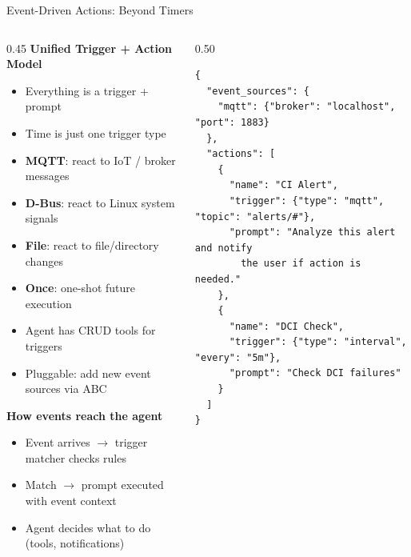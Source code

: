 \documentclass[aspectratio=169,10pt]{beamer}
\begin{document}
\begin{frame}[fragile]{Event-Driven Actions: Beyond Timers}
\begin{columns}[T]
\begin{column}{0.45\textwidth}
\textbf{Unified Trigger + Action Model}
\begin{itemize}\scriptsize\setlength{\itemsep}{1pt}
  \item Everything is a \alert{trigger + prompt}
  \item Time is just one trigger type
  \item \textbf{MQTT}: react to IoT / broker messages
  \item \textbf{D-Bus}: react to Linux system signals
  \item \textbf{File}: react to file/directory changes
  \item \textbf{Once}: one-shot future execution
  \item Agent has CRUD tools for triggers
  \item Pluggable: add new event sources via ABC
\end{itemize}

\smallskip
\textbf{How events reach the agent}
\begin{itemize}\scriptsize\setlength{\itemsep}{1pt}
  \item Event arrives $\to$ trigger matcher checks rules
  \item Match $\to$ prompt executed with event context
  \item Agent decides what to do (tools, notifications)
\end{itemize}
\end{column}
\begin{column}{0.50\textwidth}
\begin{lstlisting}[style=json,basicstyle=\ttfamily\fontsize{5}{6}\selectfont,title={\scriptsize event-schedules.json}]
{
  "event_sources": {
    "mqtt": {"broker": "localhost", "port": 1883}
  },
  "actions": [
    {
      "name": "CI Alert",
      "trigger": {"type": "mqtt", "topic": "alerts/#"},
      "prompt": "Analyze this alert and notify
        the user if action is needed."
    },
    {
      "name": "DCI Check",
      "trigger": {"type": "interval", "every": "5m"},
      "prompt": "Check DCI failures"
    }
  ]
}
\end{lstlisting}
\end{column}
\end{columns}
\end{frame}
\end{document}
